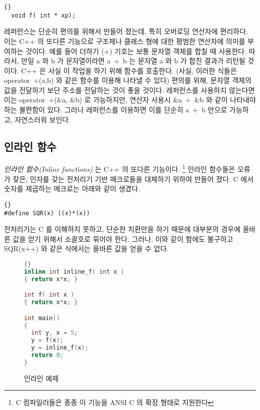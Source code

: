 \begin{lstlisting}[stepnumber=0]{}
  void f( int * xp);
\end{lstlisting}

레퍼런스는 단순히 편의를 위해서 만들어 졌는데, 특히 오버로딩 연산자에
편리하다. 이는 C++ 의 또다른 기능으로 구조체나 클래스 형에 대한 평범한
연산자에 의미를 부여하는 것이다. 예를 들어 더하기 ({\code +}) 기호는
보통 문자열 객체를 합칠 때 사용한다. 따라서, 만일 {\code a} 와 {\code b} 가
문자열이라면 {\code a~+~b} 는 문자열 {\code a} 와 {\code b} 가 합친
결과가 리턴될 것이다. C++ 은 사실 이 작업을 하기 위해 함수를 호출한다. 
(사실, 이러한 식들은 {\code operator~+(a,b)} 와 같은 함수를 이용해 나타낼 수 있다) 
편의를 위해, 문자열 객체의 값을 전달하기 보단 주소를 전달하는 것이 좋을 것이다. 
레퍼런스를 사용하지 않는다면 이는 {\code operator~+(\&a, \&b)} 로 가능하지만, 
연산자 사용시 {\code \&a~+~\&b} 와 같이 나타내야 하는 불편함이 있다. 그러나
레퍼런스를 이용하면 이를 단순히 {\code a~+~b} 만으로 가능하고, 자연스러워 보인다. 


\subsection{인라인 함수 }

\emph{인라인 함수(Inline functions)} 는 C++ 의 또다른 기능이다.
\footnote{C 컴파일러들은 종종 이 기능을 ANSI C 의 확장 형태로 지원한다} 
인라인 함수들은 오류가 잦은, 인자를 갖는 전처리기 기반 매크로들을 대체하기
위하여 만들어 졌다. C 에서 숫자를 제곱하는 메크로는 아래와 같이 생겼다. 

\begin{lstlisting}[stepnumber=0]{}
#define SQR(x) ((x)*(x))
\end{lstlisting}
\noindent 
전처리기는 C 를 이해하지 못하고, 단순한 치환만을 하기 때문에 대부분의 경우에
올바른 값을 얻기 위해서 소괄호로 묶어야 한다. 그러나, 이와 같이 함에도 불구하고
{\code SQR(x++)} 와 같은 식에서는 올바른 값을 얻을 수 없다. 

\begin{figure}
\begin{lstlisting}[language=C++,frame=tlrb]{}
inline int inline_f( int x ) 
{ return x*x; }

int f( int x ) 
{ return x*x; }

int main()
{
  int y, x = 5;
  y = f(x);
  y = inline_f(x);
  return 0;
}
\end{lstlisting}
\caption{인라인 예제 \label{fig:InlineFun}}
\end{figure}

